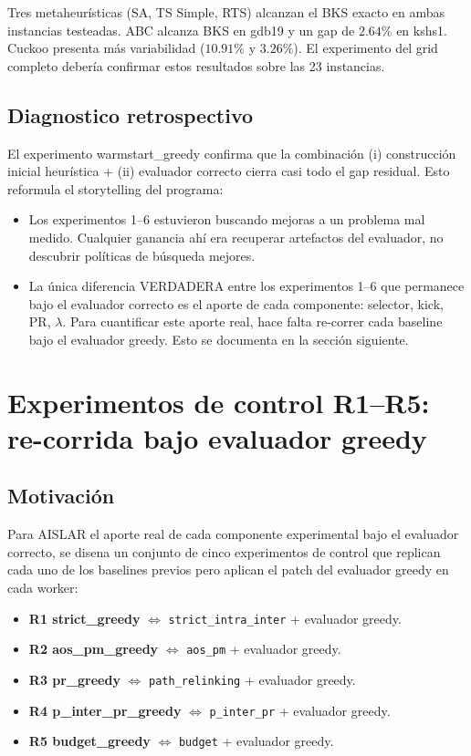 \documentclass[11pt,a4paper]{article}
\theoremstyle{definition}
\theoremstyle{remark}
\begin{document}
Tres metaheurísticas (SA, TS Simple, RTS) alcanzan el BKS exacto en
ambas instancias testeadas. ABC alcanza BKS en gdb19 y un gap de
$2.64\%$ en kshs1. Cuckoo presenta más variabilidad
($10.91\%$ y $3.26\%$). El experimento del grid completo
debería confirmar estos resultados sobre las 23 instancias.

\subsection{Diagnostico retrospectivo}

El experimento warmstart\_greedy confirma que la combinación
(i) construcción inicial heurística + (ii) evaluador correcto cierra
casi todo el gap residual. Esto reformula el storytelling del programa:

\begin{itemize}
\item Los experimentos 1--6 estuvieron buscando mejoras a un
  problema mal medido. Cualquier ganancia ahí era recuperar
  artefactos del evaluador, no descubrir políticas de búsqueda mejores.
\item La única diferencia VERDADERA entre los experimentos 1--6 que
  permanece bajo el evaluador correcto es el aporte de cada
  componente: selector, kick, PR, $\lambda$. Para cuantificar este
  aporte real, hace falta re-correr cada baseline bajo el evaluador
  greedy. Esto se documenta en la sección siguiente.
\end{itemize}

\section{Experimentos de control R1--R5: re-corrida bajo evaluador greedy}
\label{sec:re-greedy}

\subsection{Motivación}

Para AISLAR el aporte real de cada componente experimental bajo el
evaluador correcto, se disena un conjunto de cinco experimentos de
control que replican cada uno de los baselines previos pero aplican el
patch del evaluador greedy en cada worker:

\begin{itemize}
\item \textbf{R1 strict\_greedy} $\Leftrightarrow$ \texttt{strict\_intra\_inter}
  + evaluador greedy.
\item \textbf{R2 aos\_pm\_greedy} $\Leftrightarrow$ \texttt{aos\_pm}
  + evaluador greedy.
\item \textbf{R3 pr\_greedy} $\Leftrightarrow$ \texttt{path\_relinking}
  + evaluador greedy.
\item \textbf{R4 p\_inter\_pr\_greedy} $\Leftrightarrow$ \texttt{p\_inter\_pr}
  + evaluador greedy.
\item \textbf{R5 budget\_greedy} $\Leftrightarrow$ \texttt{budget}
  + evaluador greedy.
\end{itemize}
\end{document}
